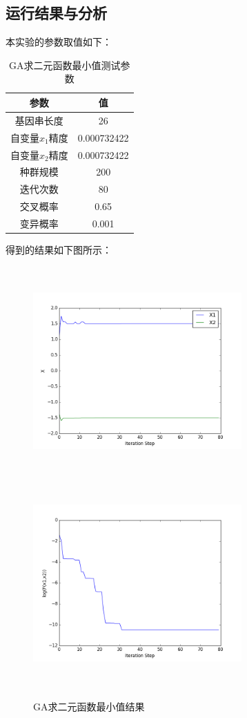 \documentclass[UTF8]{ctexart}
\begin{document}
\subsection{运行结果与分析}
\indent 本实验的参数取值如下：
\begin{table}[htbp]\centering
\begin{tabular}{cc}
  \toprule
  参数 & 值 \\
  \midrule
  基因串长度 & 26 \\
  自变量$x_1$精度 & 0.000732422\\
  自变量$x_2$精度 & 0.000732422\\
  种群规模   & 200 \\
  迭代次数   & 80 \\
  交叉概率   & 0.65 \\
  变异概率   & 0.001 \\
  \bottomrule
\end{tabular}
\caption{GA求二元函数最小值测试参数}
\end{table}

\indent 得到的结果如下图所示：
\clearpage

\begin{figure}[htbp]\centering
\includegraphics [width=8cm,height=8cm]{../pic/T1-2_res_x1_x2.png} 
\includegraphics [width=8cm,height=8cm]{../pic/T1-2_res_f.png} 
\caption{GA求二元函数最小值结果}
\end{figure}
\end{document}

